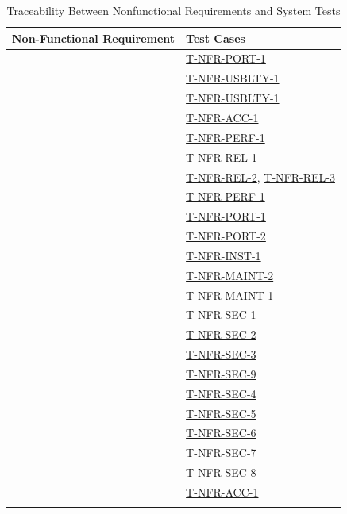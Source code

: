 \documentclass[12pt, titlepage]{article}
\providecommand{\descriptiveid}[1]{\texttt{\detokenize{#1}}}
\providecommand{\nfrref}[1]{\descriptiveid{#1}}
\begin{document}
  \begin{longtable}{p{} p{}}

    \toprule
    Non-Functional Requirement & Test Cases \\
    \midrule
    \nfrref{NFR_ScreenSize} & \hyperref[T-NFR-PORT-1]{T-NFR-PORT-1} \\ \hline
    \nfrref{NFR_UsabilityFirstSuccess} & \hyperref[T-NFR-USBLTY-1]{T-NFR-USBLTY-1} \\ \hline
    \nfrref{NFR_LearnUnassisted} & \hyperref[T-NFR-USBLTY-1]{T-NFR-USBLTY-1} \\ \hline
    \nfrref{NFR_AccessibilityWCAG} & \hyperref[T-NFR-ACC-1]{T-NFR-ACC-1} \\ \hline
    \nfrref{NFR_PerfTail} & \hyperref[T-NFR-PERF-1]{T-NFR-PERF-1} \\ \hline
    \nfrref{NFR_Uptime} & \hyperref[T-NFR-REL-1]{T-NFR-REL-1} \\ \hline
    \nfrref{NFR_Recoverable} & \hyperref[T-NFR-REL-2]{T-NFR-REL-2}, \hyperref[T-NFR-REL-3]{T-NFR-REL-3} \\ \hline
    \nfrref{NFR_PeakUsers} & \hyperref[T-NFR-PERF-1]{T-NFR-PERF-1} \\ \hline
    \nfrref{NFR_Browsers} & \hyperref[T-NFR-PORT-1]{T-NFR-PORT-1} \\ \hline
    \nfrref{NFR_Container} & \hyperref[T-NFR-PORT-2]{T-NFR-PORT-2} \\ \hline
    \nfrref{NFR_DeployUnassisted} & \hyperref[T-NFR-INST-1]{T-NFR-INST-1} \\ \hline
    \nfrref{NFR_ChangeEffort} & \hyperref[T-NFR-MAINT-2]{T-NFR-MAINT-2} \\ \hline
    \nfrref{NFR_LiveDisable} & \hyperref[T-NFR-MAINT-1]{T-NFR-MAINT-1} \\ \hline
    \nfrref{NFR_Authenticate} & \hyperref[T-NFR-SEC-1]{T-NFR-SEC-1} \\ \hline
    \nfrref{NFR_Authorize} & \hyperref[T-NFR-SEC-2]{T-NFR-SEC-2} \\ \hline
    \nfrref{NFR_ConcurrencySafety} & \hyperref[T-NFR-SEC-3]{T-NFR-SEC-3} \\ \hline
    \nfrref{NFR_EssentialPersonal} & \hyperref[T-NFR-SEC-9]{T-NFR-SEC-9} \\ \hline
    \nfrref{NFR_EncryptTransit} & \hyperref[T-NFR-SEC-4]{T-NFR-SEC-4} \\ \hline
    \nfrref{NFR_EncryptRest} & \hyperref[T-NFR-SEC-5]{T-NFR-SEC-5} \\ \hline
    \nfrref{NFR_PasswordHash} & \hyperref[T-NFR-SEC-6]{T-NFR-SEC-6} \\ \hline
    \nfrref{NFR_AuditLog} & \hyperref[T-NFR-SEC-7]{T-NFR-SEC-7} \\ \hline
    \nfrref{NFR_AuditTamper} & \hyperref[T-NFR-SEC-8]{T-NFR-SEC-8} \\ \hline
    \nfrref{NFR_ComplianceAODA} & \hyperref[T-NFR-ACC-1]{T-NFR-ACC-1} \\ \hline

    \bottomrule

    \caption{Traceability Between Nonfunctional Requirements and System Tests}
    \label{tab:NFR2Test}
  \end{longtable}
\end{document}
